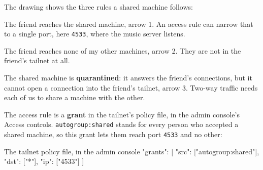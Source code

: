 \documentclass[11pt,a4paper]{article}
\begin{document}
\begin{center}
\end{center}

The drawing shows the three rules a shared machine follows:

\begin{compactitemize}
  \item The friend reaches the shared machine, arrow 1. An access rule can narrow that to a single port, here \texttt{4533}, where the music server  listens.
  \item The friend reaches none of my other machines, arrow 2. They are not in the friend's tailnet at all.
  \item The shared machine is \textbf{quarantined}: it answers the friend's connections, but it cannot open a connection into the friend's tailnet, arrow 3. Two-way traffic needs each of us to share a machine with the other.
\end{compactitemize}

The access rule is a \textbf{grant} in the tailnet's policy file, in the admin console's Access controls. \texttt{autogroup:shared} stands for every person who accepted a shared machine, so this grant lets them reach port \texttt{4533} and no other:

\begin{config}{The tailnet policy file, in the admin console}
"grants": [
  {"src": ["autogroup:shared"], "dst": ["*"], "ip": ["4533"]}
]
\end{config}
\end{document}
